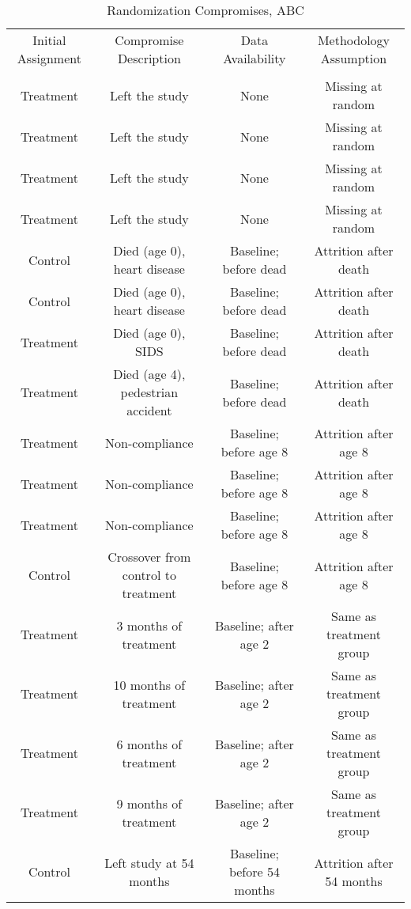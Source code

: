 \begin{sidewaystable}[H] 
\begin{threeparttable}
\caption{Randomization Compromises, ABC}
\label{table:abccompromises}
\centering
\footnotesize
\begin{tabular}{cccc} \toprule
Initial Assignment & Compromise Description & Data Availability & Methodology Assumption \\ \\ \midrule
Treatment & Left the study & None & Missing at random \\
Treatment & Left the study & None & Missing at random \\
Treatment & Left the study & None & Missing at random \\
Treatment & Left the study & None & Missing at random \\ \midrule
Control  & Died (age 0), heart disease & Baseline; before dead & Attrition after death \\
Control  & Died (age 0), heart disease & Baseline; before dead & Attrition after death \\
Treatment & Died (age 0), SIDS & Baseline; before dead & Attrition after death \\
Treatment  & Died (age 4), pedestrian accident & Baseline; before dead & Attrition after death \\ \midrule
Treatment  & Non-compliance  & Baseline; before age 8 & Attrition after age 8  \\
Treatment  & Non-compliance  & Baseline; before age 8 & Attrition after age 8  \\
Treatment  & Non-compliance  & Baseline; before age 8 & Attrition after age 8  \\ \midrule
Control        & Crossover from control to treatment & Baseline; before age 8 & Attrition after age 8  \\ \midrule
Treatment   & 3 months of treatment &  Baseline; after age 2 & Same as treatment group  \\  
Treatment &10 months of treatment &  Baseline; after age 2 & Same as treatment group  \\
Treatment & 6 months of treatment &  Baseline; after age 2 & Same as treatment group  \\ 
Treatment & 9 months of treatment &  Baseline; after age 2 & Same as treatment group  \\  \midrule
Control  & Left study at 54 months & Baseline; before 54 months & Attrition after 54 months \\ \midrule

\end{tabular}
\end{threeparttable}
\end{sidewaystable}
